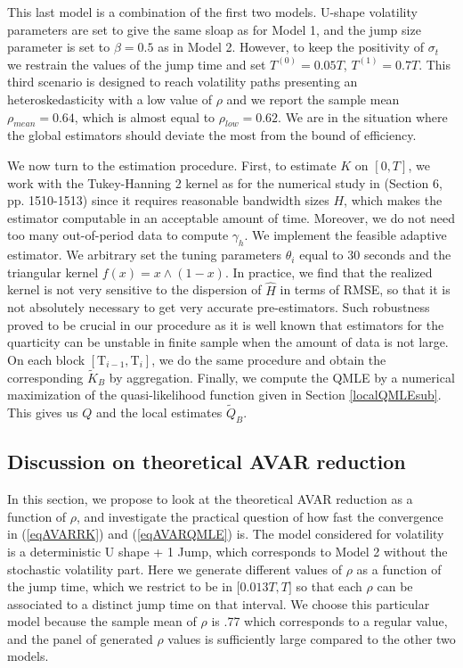 \documentclass[11pt]{article}
\numberwithin{equation}{section}
\newcommand{\Tau}{\mathrm{T}}
\theoremstyle{plain}
\theoremstyle{remark}
\begin{document}
 This last model is a combination of the first two models. U-shape volatility parameters are set to give the same sloap as for Model 1, and the jump size parameter is set to $\beta = 0.5$ as in Model 2. However, to keep the positivity of $\sigma_t$ we restrain the values of the jump time and set $T^{(0)} = 0.05 T$, $T^{(1)} = 0.7T$. This third scenario is designed to reach volatility paths presenting an heteroskedasticity with a low value of $\rho$ and we report the sample mean $\rho_{mean} = 0.64$, which is almost equal to $\rho_{low} =0.62$. We are in the situation where the global estimators should deviate the most from the bound of efficiency.    
\bigskip

We now turn to the estimation procedure. First, to estimate $K$ on $[0, T]$, we work with the Tukey-Hanning 2 kernel as for the numerical study in \cite{barndorff2008designing} (Section 6, pp. 1510-1513) since it requires reasonable bandwidth sizes $H$, which makes the estimator computable in an acceptable amount of time. Moreover, we do not need too many out-of-period data to compute $\gamma_h$. We implement the feasible adaptive estimator. We arbitrary set the tuning parameters $\theta_i$ equal to 30 seconds and the triangular kernel $f(x) = x \wedge (1-x)$. In practice, we find that the realized kernel is not very sensitive to the dispersion of $\widehat{H}$ in terms of RMSE, so that it is not absolutely necessary to get very accurate pre-estimators. Such robustness proved to be crucial in our procedure as it is well known that estimators for the quarticity can be unstable in finite sample when the amount of data is not large. On each block $[\Tau_{i-1}, \Tau_i]$, we do the same procedure and obtain the corresponding $\tilde{K}_B$ by aggregation. Finally, we compute the QMLE by a numerical maximization of the quasi-likelihood function given in Section \ref{localQMLEsub}. This gives us $Q$ and the local estimates $\tilde{Q}_B$.

\subsection{Discussion on theoretical AVAR reduction}
\label{AVARreduction}
In this section, we propose to look at the theoretical AVAR reduction as a function of $\rho$, and investigate the practical question of how fast the convergence in (\ref{eqAVARRK}) and (\ref{eqAVARQMLE}) is. The model considered for volatility is a deterministic U shape + 1 Jump, which corresponds to Model 2 without the stochastic volatility part. Here we generate different values of $\rho$ as a function of the jump time, which we restrict to be in $\big[0.013T, T \big]$ so that each $\rho$ can be associated to a distinct jump time on that interval. We choose this particular model because the sample mean of $\rho$ is .77 which corresponds to a regular value, and the panel of generated $\rho$ values is sufficiently large compared to the other two models.
\end{document}
